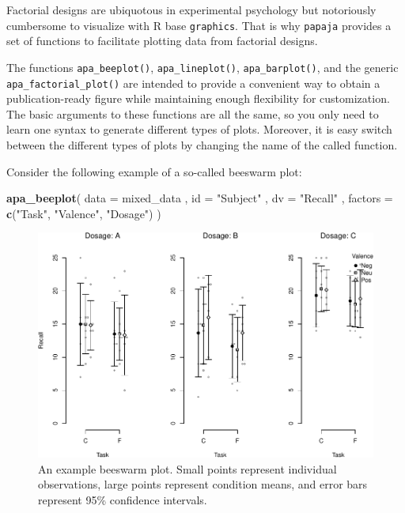 \documentclass[man,floatsintext]{apa6}
\newenvironment{Shaded}{\begin{snugshade}}{\end{snugshade}}
\newcommand{\KeywordTok}[1]{\textcolor[rgb]{0.13,0.29,0.53}{\textbf{#1}}}
\newcommand{\DataTypeTok}[1]{\textcolor[rgb]{0.13,0.29,0.53}{#1}}
\newcommand{\StringTok}[1]{\textcolor[rgb]{0.31,0.60,0.02}{#1}}
\newcommand{\NormalTok}[1]{#1}
\theoremstyle{definition}
\theoremstyle{definition}
\theoremstyle{definition}
\theoremstyle{remark}
\begin{document}
Factorial designs are ubiquotous in experimental psychology but
notoriously cumbersome to visualize with R base \texttt{graphics}. That
is why \texttt{papaja} provides a set of functions to facilitate
plotting data from factorial designs.

The functions \texttt{apa\_beeplot()}, \texttt{apa\_lineplot()},
\texttt{apa\_barplot()}, and the generic \texttt{apa\_factorial\_plot()}
are intended to provide a convenient way to obtain a publication-ready
figure while maintaining enough flexibility for customization. The basic
arguments to these functions are all the same, so you only need to learn
one syntax to generate different types of plots. Moreover, it is easy
switch between the different types of plots by changing the name of the
called function.

Consider the following example of a so-called beeswarm plot:





\begin{Shaded}
\begin{Highlighting}[]
\KeywordTok{apa_beeplot}\NormalTok{(}
  \DataTypeTok{data =}\NormalTok{ mixed_data}
\NormalTok{  , }\DataTypeTok{id =} \StringTok{"Subject"}
\NormalTok{  , }\DataTypeTok{dv =} \StringTok{"Recall"}
\NormalTok{  , }\DataTypeTok{factors =} \KeywordTok{c}\NormalTok{(}\StringTok{"Task"}\NormalTok{, }\StringTok{"Valence"}\NormalTok{, }\StringTok{"Dosage"}\NormalTok{)}
\NormalTok{)}
\end{Highlighting}
\end{Shaded}

\begin{figure}
\centering
\includegraphics{paper_files/figure-latex/beeswarm2-1.pdf}
\caption{\label{fig:beeswarm2}An example beeswarm plot. Small points represent
individual observations, large points represent condition means, and
error bars represent 95\% confidence intervals.}
\end{figure}
\end{document}
